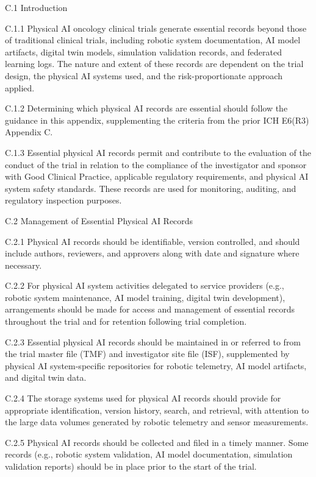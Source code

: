 \documentclass[11pt]{article}
\begin{document}
C.1 Introduction

C.1.1 Physical AI oncology clinical trials generate essential records beyond those of traditional clinical trials, including robotic system documentation, AI model artifacts, digital twin models, simulation validation records, and federated learning logs. The nature and extent of these records are dependent on the trial design, the physical AI systems used, and the risk-proportionate approach applied.

C.1.2 Determining which physical AI records are essential should follow the guidance in this appendix, supplementing the criteria from the prior ICH E6(R3) Appendix C.

C.1.3 Essential physical AI records permit and contribute to the evaluation of the conduct of the trial in relation to the compliance of the investigator and sponsor with Good Clinical Practice, applicable regulatory requirements, and physical AI system safety standards. These records are used for monitoring, auditing, and regulatory inspection purposes.

C.2 Management of Essential Physical AI Records

C.2.1 Physical AI records should be identifiable, version controlled, and should include authors, reviewers, and approvers along with date and signature where necessary.

C.2.2 For physical AI system activities delegated to service providers (e.g., robotic system maintenance, AI model training, digital twin development), arrangements should be made for access and management of essential records throughout the trial and for retention following trial completion.

C.2.3 Essential physical AI records should be maintained in or referred to from the trial master file (TMF) and investigator site file (ISF), supplemented by physical AI system-specific repositories for robotic telemetry, AI model artifacts, and digital twin data.

C.2.4 The storage systems used for physical AI records should provide for appropriate identification, version history, search, and retrieval, with attention to the large data volumes generated by robotic telemetry and sensor measurements.

C.2.5 Physical AI records should be collected and filed in a timely manner. Some records (e.g., robotic system validation, AI model documentation, simulation validation reports) should be in place prior to the start of the trial.
\end{document}
